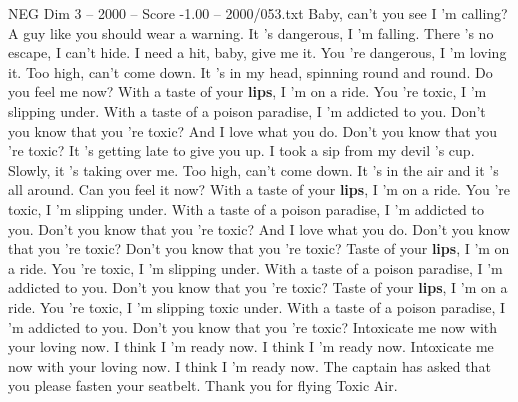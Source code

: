 \begin{textsample}{NEG Dim 3 – 2000 – Score -1.00 – 2000/053.txt}  \label{ex:f3_neg_020}
Baby, can't you see I 'm calling?
A guy like you should wear a warning.
It 's dangerous, I 'm falling.
There 's no escape, I can't hide.
I need a hit, baby, give me it.
You 're dangerous, I 'm loving it.
Too high, can't come down.
It 's in my head, spinning round and round.
Do you feel me now?
With a taste of your \textbf{lips}, I 'm on a ride.
You 're toxic, I 'm slipping under.
With a taste of a poison paradise, I 'm addicted to you.
Don't you know that you 're toxic?
And I love what you do.
Don't you know that you 're toxic?
It 's getting late to give you up.
I took a sip from my devil 's cup.
Slowly, it 's taking over me.
Too high, can't come down.
It 's in the air and it 's all around.
Can you feel it now?
With a taste of your \textbf{lips}, I 'm on a ride.
You 're toxic, I 'm slipping under.
With a taste of a poison paradise, I 'm addicted to you.
Don't you know that you 're toxic?
And I love what you do.
Don't you know that you 're toxic?
Don't you know that you 're toxic?
Taste of your \textbf{lips}, I 'm on a ride.
You 're toxic, I 'm slipping under.
With a taste of a poison paradise, I 'm addicted to you.
Don't you know that you 're toxic?
Taste of your \textbf{lips}, I 'm on a ride.
You 're toxic, I 'm slipping toxic under.
With a taste of a poison paradise, I 'm addicted to you.
Don't you know that you 're toxic?
Intoxicate me now with your loving now.
I think I 'm ready now.
I think I 'm ready now.
Intoxicate me now with your loving now.
I think I 'm ready now.
The captain has asked that you please fasten your seatbelt.
Thank you for flying Toxic Air.

\end{textsample}
